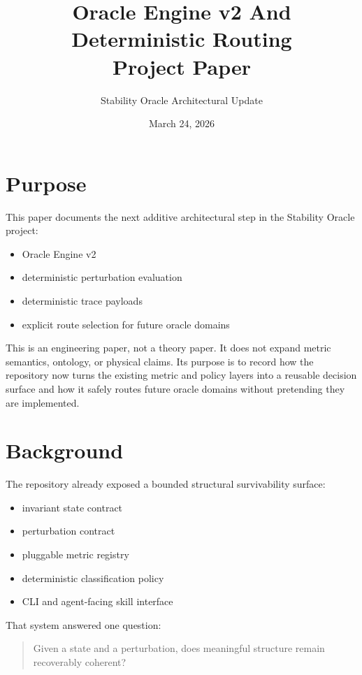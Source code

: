 \documentclass[11pt]{article}
\title{Oracle Engine v2 And Deterministic Routing\\Project Paper}
\author{Stability Oracle Architectural Update}
\date{March 24, 2026}
\begin{document}
\maketitle
\tableofcontents
\newpage

\section{Purpose}

This paper documents the next additive architectural step in the Stability Oracle project:

\begin{itemize}
\item Oracle Engine v2
\item deterministic perturbation evaluation
\item deterministic trace payloads
\item explicit route selection for future oracle domains
\end{itemize}

This is an engineering paper, not a theory paper.
It does not expand metric semantics, ontology, or physical claims.
Its purpose is to record how the repository now turns the existing metric and policy layers into a reusable decision surface and how it safely routes future oracle domains without pretending they are implemented.

\section{Background}

The repository already exposed a bounded structural survivability surface:

\begin{itemize}
\item invariant state contract
\item perturbation contract
\item pluggable metric registry
\item deterministic classification policy
\item CLI and agent-facing skill interface
\end{itemize}

That system answered one question:

\begin{quote}
Given a state and a perturbation, does meaningful structure remain recoverably coherent?
\end{quote}
\end{document}
